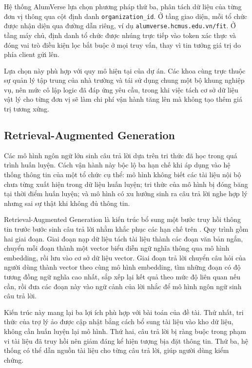 \documentclass[12pt,a4paper,oneside]{report}
\begin{document}
Hệ thống AlumVerse lựa chọn phương pháp thứ ba, phân tách dữ liệu của từng đơn vị thông qua cột định danh \texttt{organization\_id}. Ở tầng giao diện, mỗi tổ chức được nhận diện qua đường dẫn riêng, ví dụ \texttt{alumverse.hcmus.edu.vn/fit}. Ở tầng máy chủ, định danh tổ chức được nhúng trực tiếp vào token xác thực và đóng vai trò điều kiện lọc bắt buộc ở mọi truy vấn, thay vì tin tưởng giá trị do phía client gửi lên.

Lựa chọn này phù hợp với quy mô hiện tại của dự án. Các khoa cùng trực thuộc sự quản lý tập trung của nhà trường và tái sử dụng chung một bộ khung nghiệp vụ, nên mức cô lập logic đã đáp ứng yêu cầu, trong khi việc tách cơ sở dữ liệu vật lý cho từng đơn vị sẽ làm chi phí vận hành tăng lên mà không tạo thêm giá trị tương xứng.

\subsection{Retrieval-Augmented Generation}

Các mô hình ngôn ngữ lớn sinh câu trả lời dựa trên tri thức đã học trong quá trình huấn luyện. Cách vận hành này bộc lộ ba hạn chế khi áp dụng vào hệ thống thông tin của một tổ chức cụ thể: mô hình không biết các tài liệu nội bộ chưa từng xuất hiện trong dữ liệu huấn luyện; tri thức của mô hình bị đóng băng tại thời điểm huấn luyện; và mô hình có xu hướng sinh ra câu trả lời nghe hợp lý nhưng sai sự thật khi không đủ thông tin.

Retrieval-Augmented Generation là kiến trúc bổ sung một bước truy hồi thông tin trước bước sinh câu trả lời nhằm khắc phục các hạn chế trên \cite{rag}. Quy trình gồm hai giai đoạn. Giai đoạn nạp dữ liệu tách tài liệu thành các đoạn văn bản ngắn, chuyển mỗi đoạn thành một vector biểu diễn ngữ nghĩa thông qua mô hình embedding, rồi lưu vào cơ sở dữ liệu vector. Giai đoạn trả lời chuyển câu hỏi của người dùng thành vector theo cùng mô hình embedding, tìm những đoạn có độ tương đồng ngữ nghĩa cao nhất, sắp xếp lại kết quả theo mức độ liên quan nếu cần, rồi đưa các đoạn này vào ngữ cảnh của lời nhắc để mô hình ngôn ngữ sinh câu trả lời.

Kiến trúc này mang lại ba lợi ích phù hợp với bài toán của đề tài. Thứ nhất, tri thức của trợ lý ảo được cập nhật bằng cách bổ sung tài liệu vào kho dữ liệu, không cần huấn luyện lại mô hình. Thứ hai, câu trả lời bị ràng buộc trong phạm vi tài liệu đã truy hồi nên giảm đáng kể hiện tượng bịa đặt thông tin. Thứ ba, hệ thống có thể dẫn nguồn tài liệu cho từng câu trả lời, giúp người dùng kiểm chứng.
\end{document}
